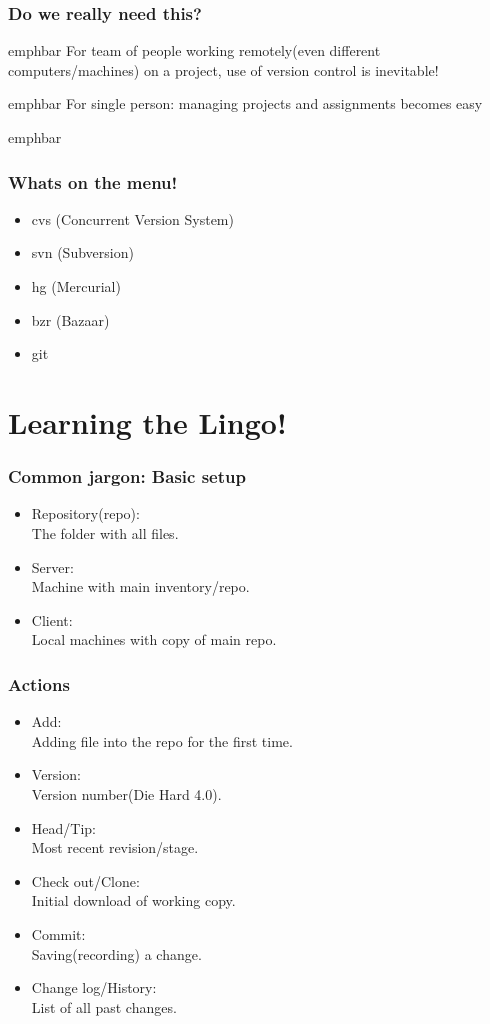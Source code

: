 \documentclass[14pt,compress]{beamer}
\newcommand{\emphbar}[1]
{\begin{beamercolorbox}[rounded=true]{emphbar} 
      {#1}
 \end{beamercolorbox}
}
\newcounter{time}
\newcommand{\inctime}[1]{\addtocounter{time}{#1}{\tiny \thetime\ m}}
\begin{document}
\begin{frame}
  \frametitle{Do we really need this?}
  \emphbar{For team of people working remotely(even different computers/machines) on a project, use of version control is inevitable!}
  \vspace{0.15in}
  \emphbar{For single person: managing projects and assignments becomes easy}
  \vspace{0.15in}
  \pause
  \emphbar{\color{red}{It is a good habit!}}
\end{frame}

\begin{frame}
  \frametitle{Whats on the menu!}
  \begin{itemize}
  \item cvs (Concurrent Version System)
  \item svn (Subversion)
  \item hg (Mercurial)
  \item bzr (Bazaar)
  \item git
  \end{itemize}
  \inctime{10}
\end{frame}

\section{Learning the Lingo!}

\begin{frame}
  \frametitle{Common jargon: Basic setup}
  \begin{itemize}
  \item Repository(repo):\\
        The folder with all files.
  \item Server:\\
        Machine with main inventory/repo.
  \item Client:\\
        Local machines with copy of main repo.
  \end{itemize}
\end{frame}

\begin{frame}
  \frametitle{Actions}
  \begin{itemize}
  \item Add:\\
    Adding file into the repo for the first time.
  \item Version:\\
    Version number(Die Hard 4.0).
  \item Head/Tip:\\
    Most recent revision/stage.
  \item Check out/Clone:\\
    Initial download of working copy.
  \item Commit:\\
    Saving(recording) a change.
  \item Change log/History:\\
    List of all past changes.
  \end{itemize}
\end{frame}
\end{document}

